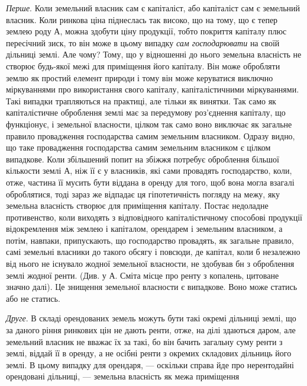 \emph{Перше}. Коли земельний власник сам є капіталіст, або капіталіст сам є
земельний власник. Коли ринкова ціна піднеслась так високо, що на тому,
що є тепер землею роду $А$, можна здобути ціну продукції, тобто покриття капіталу
плюс пересічний зиск, то він може в цьому випадку \emph{сам господарювати}
на своїй дільниці землі. Але чому? Тому, що у відношенні до нього земельна
власність не створює будь-якої межі для приміщення його капіталу.
Він може обробляти землю як простий елемент природи і тому він може керуватися
виключно міркуваннями про використання свого капіталу, капіталістичними
міркуваннями. Такі випадки трапляються на практиці, але тільки як винятки.
Так само як капіталістичне оброблення землі має за передумову роз’єднення капіталу,
що функціонує, і земельної власности, цілком так само воно виключає як
загальне правило провадження господарства самим земельним власником. Одразу
видно, що таке провадження господарства самим земельним власником є цілком
випадкове. Коли збільшений попит на збіжжя потребує оброблення більшої кількости
землі $А$, ніж її є у власників, які сами провадять господарство, коли, отже,
частина її мусить бути віддана в оренду для того, щоб вона могла взагалі оброблятися,
тоді зараз же відпадає ця гіпотетичність погляду на межу, яку земельна
власність створює для приміщення капіталу. Постає недоладне противенство,
коли виходять з відповідного капіталістичному способові продукції відокремлення
між землею і капіталом, орендарем і земельним власником, а потім,
навпаки, припускають, що господарство провадять, як загальне правило, самі
земельні власники до такого обсягу і повсюди, де капітал, коли б незалежно
від нього не існувало жодної земельної власности, не здобував бн з оброблення
землі жодної ренти. (Див. у А. Сміта місце про ренту з копалень, цитоване
значно далі). Це знищення земельної власности є випадкове. Воно може статись
або не статись.

\emph{Друге}. В складі орендованих земель можуть бути такі окремі дільниці
землі, що за даного ріння ринкових цін не дають ренти, отже, на ділі здаються
даром, але земельний власник не вважає їх за такі, бо він бачить загальну суму
ренти з землі, віддай її в оренду, а не осібні ренти з окремих складових дільниць
його землі. В цьому випадку для орендаря, — оскільки справа йде про
нерентодайні орендовані дільниці, — земельна власність як межа приміщення
\parbreak{}  %

